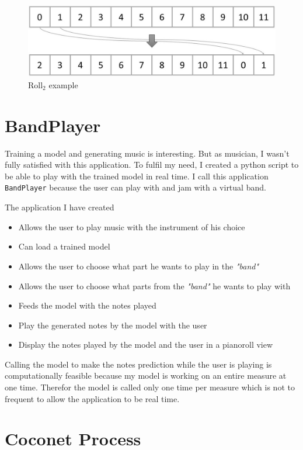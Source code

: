 \documentclass[12pt]{report}
\begin{document}
\begin{figure}[ht]
    \centering
    \includegraphics[width=\textwidth]{images/nn/tensor/roll_2.jpg}
    \caption{$\text{Roll}_2$ example}
    \label{fig:roll_2}
\end{figure}

\section{BandPlayer}

Training a model and generating music is interesting.
But as musician, I wasn't fully satisfied with this application.
To fulfil my need, I created a python script to be able to play with the trained model in real time.
I call this application \texttt{BandPlayer} because the user can play with and jam with a virtual band.

The application I have created
\begin{itemize}
    \item Allows the user to play music with the instrument of his choice
    \item Can load a trained model
    \item Allows the user to choose what part he wants to play in the \textit{"band"}
    \item Allows the user to choose what parts from the \textit{"band"} he wants to play with
    \item Feeds the model with the notes played 
    \item Play the generated notes by the model with the user
    \item Display the notes played by the model and the user in a pianoroll view
\end{itemize}

Calling the model to make the notes prediction while the user is playing is computationally feasible because my model is working on an entire measure at one time.
Therefor the model is called only one time per measure which is not to frequent to allow the application to be real time.


\section{Coconet Process}
\label{appendix:coconet_process}
\end{document}
